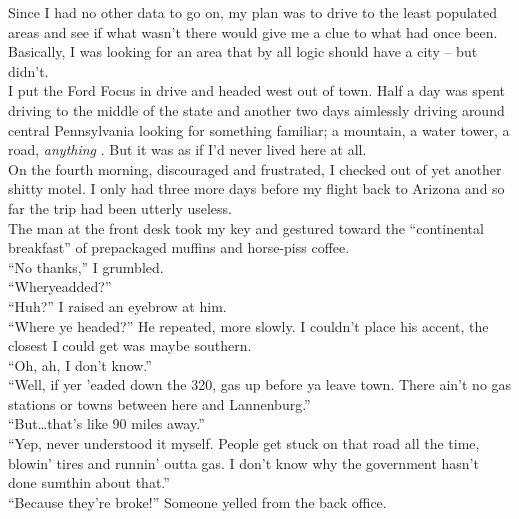 \documentclass[a5paper]{scrartcl}
\begin{document}
Since I had no other data to go on, my plan was to drive to the least populated areas and see if what wasn't there would give me a clue to what had once been. Basically, I was looking for an area that by all logic should have a city -- but didn't.\\


I put the Ford Focus in drive and headed west out of town.
Half a day was spent driving to the middle of the state and another two days aimlessly driving around central Pennsylvania looking for something familiar; a mountain, a water tower, a road, \textit{anything}
. But it was as if I'd never lived here at all.\\


On the fourth morning, discouraged and frustrated, I checked out of yet another shitty motel. I only had three more days before my flight back to Arizona and so far the trip had been utterly useless.\\


The man at the front desk took my key and gestured toward the \enquote{continental breakfast} of prepackaged muffins and 
horse-piss coffee.\\


\enquote{No thanks,} I grumbled.\\


\enquote{Wheryeadded?}\\


\enquote{Huh?} I raised an eyebrow at him.\\


\enquote{Where ye headed?} He repeated, more slowly. I couldn't place his accent, the closest I could get was maybe southern.\\


\enquote{Oh, ah, I don't know.}\\


\enquote{Well, if yer 'eaded down the 320, gas up before ya leave town. There ain't no gas stations or towns between here and Lannenburg.}\\


\enquote{But\dots that's like 90 miles away.}\\


\enquote{Yep, never understood it myself. People get stuck on that road all the time, blowin' tires and runnin' outta gas. I don't know why the government hasn't done sumthin about that.}\\


\enquote{Because they're broke!} Someone yelled from the back office.\\
\end{document}
